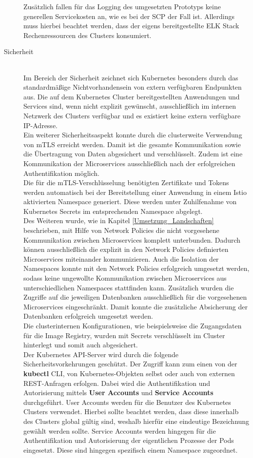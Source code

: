 \begin{description}
	Zusätzlich fallen für das Logging des umgesetzten Prototyps keine generellen Servicekosten an, wie es bei der \ac{SCP} der Fall ist. Allerdings muss hierbei beachtet werden, dass der eigens bereitgestellte ELK Stack Rechenressourcen des Clusters konsumiert.\\
\item[Sicherheit] \hfill \\
Im Bereich der Sicherheit zeichnet sich Kubernetes besonders durch das standardmäßige Nichtvorhandensein von extern verfügbaren Endpunkten aus. 
Die auf dem Kubernetes Cluster bereitgestellten Anwendungen und Services sind, wenn nicht explizit gewünscht, ausschließlich im internen Netzwerk des Clusters verfügbar und es existiert keine extern verfügbare \ac{IP}-Adresse.\\
Ein weiterer Sicherheitsaspekt konnte durch die clusterweite Verwendung von \ac{mTLS} erreicht werden. Damit ist die gesamte Kommunikation sowie die Übertragung von Daten abgesichert und verschlüsselt. Zudem ist eine Kommunikation der Microservices ausschließlich nach der erfolgreichen Authentifikation möglich.\autocite[Vgl.][]{IstioAuthors.20200106} \\
\newpage
Die für die \ac{mTLS}-Verschlüsselung benötigten Zertifikate und Tokens werden automatisch bei der Bereitstellung einer Anwendung in einem Istio aktivierten Namespace generiert. Diese werden unter Zuhilfenahme von Kubernetes Secrets im entsprechenden Namespace abgelegt.\\
Des Weiteren wurde, wie in Kapitel \ref{Umsetzung_Landschaften} beschrieben, mit Hilfe von Network Policies die nicht vorgesehene Kommunikation zwischen Microservices komplett unterbunden. Dadurch können ausschließlich die explizit in den Network Policies definierten Microservices miteinander kommunizieren. Auch die Isolation der Namespaces konnte mit den Network Policies erfolgreich umgesetzt werden, sodass keine ungewollte Kommunikation zwischen Microservices aus unterschiedlichen Namespaces stattfinden kann. Zusätzlich wurden die Zugriffe auf die jeweiligen Datenbanken ausschließlich für die vorgesehenen Microservices eingeschränkt. Damit konnte die zusätzliche Absicherung der Datenbanken erfolgreich umgesetzt werden.\\
Die clusterinternen Konfigurationen, wie beispielsweise die Zugangsdaten für die Image Registry, wurden mit Secrets verschlüsselt im Cluster hinterlegt und somit auch abgesichert.\\
Der Kubernetes \ac{API}-Server wird durch die folgende Sicherheitsvorkehrungen geschützt. Der Zugriff kann zum einen von der \textbf{kubectl} \ac{CLI}, von Kubernetes-Objekten selbst oder auch von externen \ac{REST}-Anfragen erfolgen. Dabei wird die Authentifikation und Autorisierung mittels \textbf{User Accounts} und \textbf{Service Accounts} durchgeführt. User Accounts werden für die Benutzer des Kubernetes Clusters verwendet. Hierbei sollte beachtet werden, dass diese innerhalb des Clusters global gültig sind, weshalb hierfür eine eindeutige Bezeichnung gewählt werden sollte. Service Accounts werden hingegen für die Authentifikation und Autorisierung der eigentlichen Prozesse der Pods eingesetzt. Diese sind hingegen spezifisch einem Namespace zugeordnet.\autocite[Vgl.][]{KubernetesAuthors.20190506}

\end{description}

